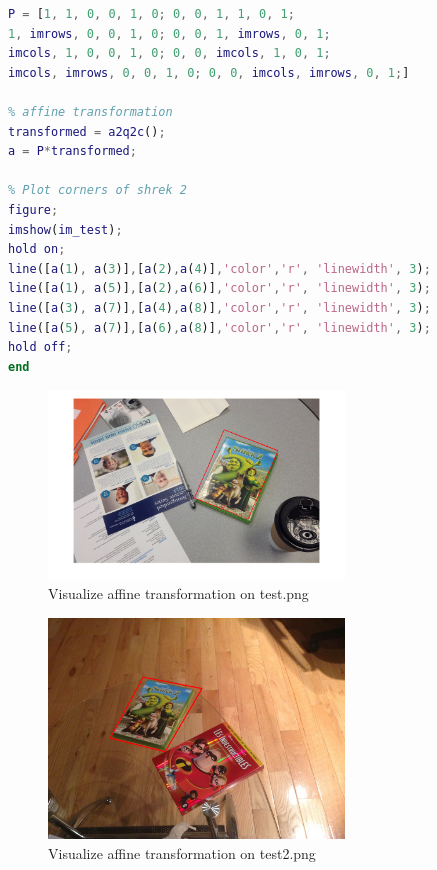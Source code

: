 \documentclass{csc_assignment4}
\begin{document}
\begin{description}
\begin{enumerate}[label=(\alph*)]
\begin{lstlisting}[language=MATLAB]
% Matrix P 
P = [1, 1, 0, 0, 1, 0; 0, 0, 1, 1, 0, 1;
1, imrows, 0, 0, 1, 0; 0, 0, 1, imrows, 0, 1;
imcols, 1, 0, 0, 1, 0; 0, 0, imcols, 1, 0, 1;
imcols, imrows, 0, 0, 1, 0; 0, 0, imcols, imrows, 0, 1;]

% affine transformation
transformed = a2q2c();
a = P*transformed;

% Plot corners of shrek 2
figure;
imshow(im_test);
hold on;
line([a(1), a(3)],[a(2),a(4)],'color','r', 'linewidth', 3);
line([a(1), a(5)],[a(2),a(6)],'color','r', 'linewidth', 3);
line([a(3), a(7)],[a(4),a(8)],'color','r', 'linewidth', 3);
line([a(5), a(7)],[a(6),a(8)],'color','r', 'linewidth', 3);
hold off;
end
\end{lstlisting}
\begin{figure}
\vspace{-20mm}
\includegraphics[width=0.7\textwidth, center]{test_affine.png}
\vspace{-10mm}
\caption{Visualize affine transformation on test.png}
\end{figure}
\begin{figure}
\vspace{-10mm}
\includegraphics[width=0.7\textwidth, center]{test2_affine.jpg}
\vspace{-5mm}
\caption{Visualize affine transformation on test2.png}
\end{figure}
\end{enumerate}


\end{description}
\end{document}
